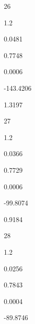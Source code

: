 \documentclass[a4paper,portrait,12pt]{article}
\begin{document}
26





1.2





0.0481





0.7748





0.0006





-143.4206





1.3197





27





1.2





0.0366





0.7729





0.0006





-99.8074





0.9184





28





1.2





0.0256





0.7843





0.0004





-89.8746
\end{document}
